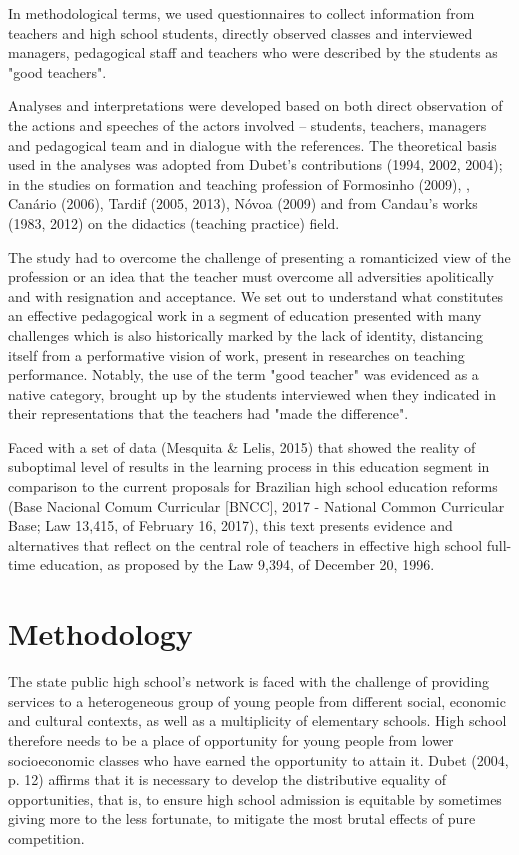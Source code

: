 \documentclass[11pt, a4paper]{article}
\begin{document}
In methodological terms, we used questionnaires to collect information from teachers and high school students, directly
observed classes and interviewed managers, pedagogical staff and teachers who were described by the students as "good
teachers".

Analyses and interpretations were developed based on both direct observation of the actions and speeches of the actors
involved – students, teachers, managers and pedagogical team and in dialogue with the references. The theoretical basis
used in the analyses was adopted from Dubet's contributions (1994, 2002, 2004); in the studies on formation and teaching
profession of Formosinho (2009), \cite{form-mach-oli-10}, Canário (2006), Tardif (2005,
2013), Nóvoa (2009) and from Candau's works (1983, 2012) on the didactics (teaching practice) field.

The study had to overcome the challenge of presenting a romanticized view of the profession or an idea that the teacher
must overcome all adversities apolitically and with resignation and acceptance. We set out to understand what constitutes
an effective pedagogical work in a segment of education presented with many challenges which is also historically
marked by the lack of identity, distancing itself from a performative vision of work, present in researches on teaching
performance. Notably, the use of the term "good teacher" was evidenced as a native category, brought up by the students
interviewed when they indicated in their representations that the teachers had "made the difference".

Faced with a set of data (Mesquita \& Lelis, 2015) that showed the reality of suboptimal level of results in the learning
process in this education segment in comparison to the current proposals for Brazilian high school education reforms
(Base Nacional Comum Curricular [BNCC], 2017 - National Common Curricular Base; Law 13,415, of February 16,
2017), this text presents evidence and alternatives that reflect on the central role of teachers in effective high school
full-time education, as proposed by the Law 9,394, of December 20, 1996.

\section{Methodology}
The state public high school's network is faced with the challenge of providing services to a heterogeneous group of
young people from different social, economic and cultural contexts, as well as a multiplicity of elementary schools. High
school therefore needs to be a place of opportunity for young people from lower socioeconomic classes who have earned
the opportunity to attain it. Dubet (2004, p. 12) affirms that it is necessary to develop the distributive equality of
opportunities, that is, to ensure high school admission is equitable by sometimes giving more to the less fortunate, to
mitigate the most brutal effects of pure competition.
\end{document}
